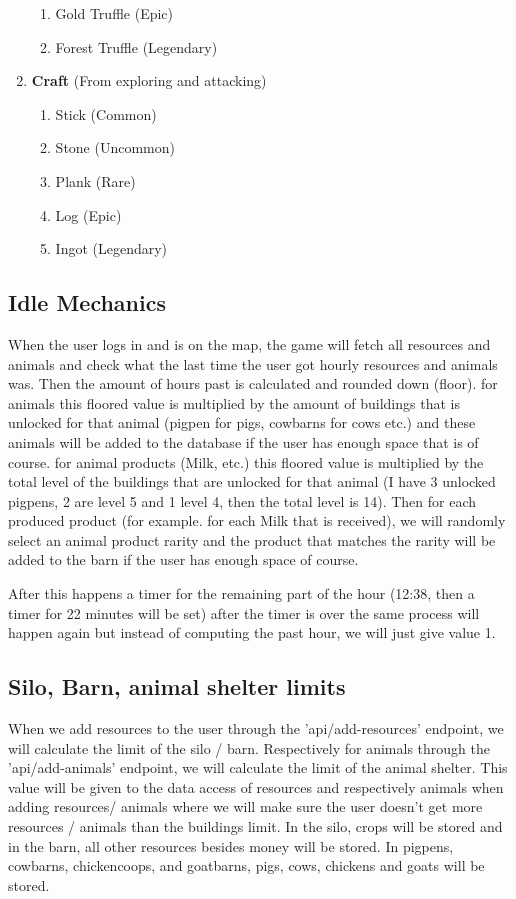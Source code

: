 \documentclass[12pt]{article}
\begin{document}
\begin{enumerate}
\begin{enumerate}
        \item Gold Truffle (Epic)
        \item Forest Truffle (Legendary)
    \end{enumerate}
    \item \textbf{Craft} (From exploring and attacking)
    \begin{enumerate}
        \item Stick (Common)
        \item Stone (Uncommon)
        \item Plank (Rare)
        \item Log (Epic)
        \item Ingot (Legendary)
    \end{enumerate}
\end{enumerate}

\subsection{Idle Mechanics}
When the user logs in and is on the map, the game will fetch all resources and animals and check what the last time the user got hourly resources and animals was.
Then the amount of hours past is calculated and rounded down (floor).
for animals this floored value is multiplied by the amount of buildings that is unlocked for that animal (pigpen for pigs, cowbarns for cows etc.) and these animals will be added to the database if the user has enough space that is of course.
for animal products (Milk, etc.) this floored value is multiplied by the total level of the buildings that are unlocked for that animal (I have 3 unlocked pigpens, 2 are level 5 and 1 level 4, then the total level is 14).
Then for each produced product (for example. for each Milk that is received),
we will randomly select an animal product rarity and the product that matches the rarity will be added to the barn if the user has enough space of course.

After this happens a timer for the remaining part of the hour (12:38, then a timer for 22 minutes will be set) after the timer is over the same process will happen again but instead of computing the past hour, we will just give value 1.

\subsection{Silo, Barn, animal shelter limits}
When we add resources to the user through the 'api/add-resources' endpoint, we will calculate the limit of the silo / barn.
Respectively for animals through the 'api/add-animals' endpoint, we will calculate the limit of the animal shelter.
This value will be given to the data access of resources and respectively animals when adding resources/ animals where we will make sure the user doesn't get more resources / animals than the buildings limit.
In the silo, crops will be stored and in the barn, all other resources besides money will be stored.
In pigpens, cowbarns, chickencoops, and goatbarns, pigs, cows, chickens and goats will be stored.
\end{document}
